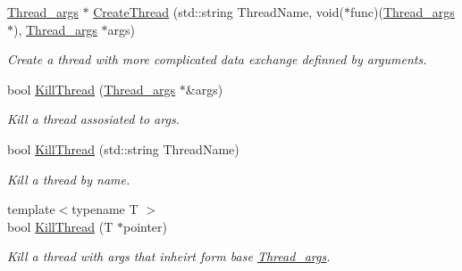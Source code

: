 \begin{DoxyCompactItemize}
\item 
\hypertarget{classUtilities_a7598372bbee218ec15275f7a84d9ff6a}{\hyperlink{structThread__args}{Thread\-\_\-args} $\ast$ \hyperlink{classUtilities_a7598372bbee218ec15275f7a84d9ff6a}{Create\-Thread} (std\-::string Thread\-Name, void($\ast$func)(\hyperlink{structThread__args}{Thread\-\_\-args} $\ast$), \hyperlink{structThread__args}{Thread\-\_\-args} $\ast$args)}\label{classUtilities_a7598372bbee218ec15275f7a84d9ff6a}

\begin{DoxyCompactList}\small\item\em Create a thread with more complicated data exchange definned by arguments. \end{DoxyCompactList}\item 
\hypertarget{classUtilities_a6f1c1d53b9ce59bb26c56a3bebdbb255}{bool \hyperlink{classUtilities_a6f1c1d53b9ce59bb26c56a3bebdbb255}{Kill\-Thread} (\hyperlink{structThread__args}{Thread\-\_\-args} $\ast$\&args)}\label{classUtilities_a6f1c1d53b9ce59bb26c56a3bebdbb255}

\begin{DoxyCompactList}\small\item\em Kill a thread assosiated to args. \end{DoxyCompactList}\item 
\hypertarget{classUtilities_a8c17a46ce33b0b647797f24bc859bd7a}{bool \hyperlink{classUtilities_a8c17a46ce33b0b647797f24bc859bd7a}{Kill\-Thread} (std\-::string Thread\-Name)}\label{classUtilities_a8c17a46ce33b0b647797f24bc859bd7a}

\begin{DoxyCompactList}\small\item\em Kill a thread by name. \end{DoxyCompactList}\item 
\hypertarget{classUtilities_af4091a68d8a27a3b806d029cc9b2135e}{{\footnotesize template$<$typename T $>$ }\\bool \hyperlink{classUtilities_af4091a68d8a27a3b806d029cc9b2135e}{Kill\-Thread} (T $\ast$pointer)}\label{classUtilities_af4091a68d8a27a3b806d029cc9b2135e}

\begin{DoxyCompactList}\small\item\em Kill a thread with args that inheirt form base \hyperlink{structThread__args}{Thread\-\_\-args}. \end{DoxyCompactList}\end{DoxyCompactItemize}


